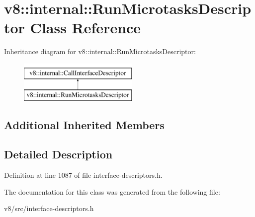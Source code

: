 \hypertarget{classv8_1_1internal_1_1RunMicrotasksDescriptor}{}\section{v8\+:\+:internal\+:\+:Run\+Microtasks\+Descriptor Class Reference}
\label{classv8_1_1internal_1_1RunMicrotasksDescriptor}
Inheritance diagram for v8\+:\+:internal\+:\+:Run\+Microtasks\+Descriptor\+:\begin{figure}[H]
\begin{center}
\leavevmode
\includegraphics[height=2.000000cm]{classv8_1_1internal_1_1RunMicrotasksDescriptor}
\end{center}
\end{figure}
\subsection*{Additional Inherited Members}


\subsection{Detailed Description}


Definition at line 1087 of file interface-\/descriptors.\+h.



The documentation for this class was generated from the following file\+:\begin{DoxyCompactItemize}
\item 
v8/src/interface-\/descriptors.\+h\end{DoxyCompactItemize}

